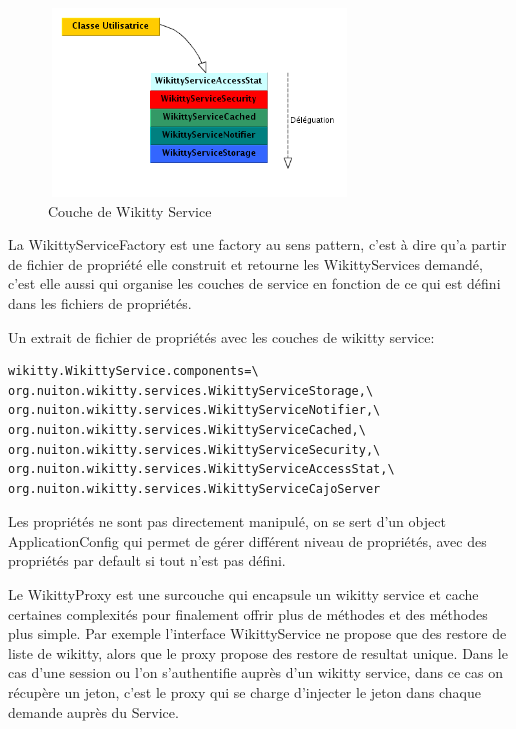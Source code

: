 \begin{figure}[!ht]
\centering
\includegraphics[height=5cm,width=8cm]{image/pileService.png}
  		\caption{Couche de Wikitty Service}
  		\label{pileService}
\end{figure}

La WikittyServiceFactory est une factory au sens pattern, c'est à dire qu'a 
partir de fichier de propriété elle construit et retourne les WikittyServices 
demandé, c'est elle aussi qui organise les couches de service en fonction de ce 
qui est défini dans les fichiers de propriétés.


Un extrait de fichier de propriétés avec les couches de wikitty service:
\begin{verbatim}
wikitty.WikittyService.components=\
org.nuiton.wikitty.services.WikittyServiceStorage,\
org.nuiton.wikitty.services.WikittyServiceNotifier,\
org.nuiton.wikitty.services.WikittyServiceCached,\
org.nuiton.wikitty.services.WikittyServiceSecurity,\
org.nuiton.wikitty.services.WikittyServiceAccessStat,\
org.nuiton.wikitty.services.WikittyServiceCajoServer
\end{verbatim}

Les propriétés ne sont pas directement manipulé, on se sert d'un object 
ApplicationConfig qui permet de gérer différent niveau de propriétés,
avec des propriétés par default si tout n'est pas défini.

Le WikittyProxy est une surcouche qui encapsule un wikitty service et cache 
certaines complexités pour finalement offrir plus de méthodes et des méthodes 
plus simple. Par exemple l'interface WikittyService ne propose que des 
restore de liste de wikitty, alors que le proxy propose des restore de resultat
unique. Dans le cas d'une session ou l'on s'authentifie auprès d'un wikitty 
service, dans ce cas on récupère un jeton, c'est le proxy qui se charge 
d'injecter le jeton dans chaque demande auprès du Service.

